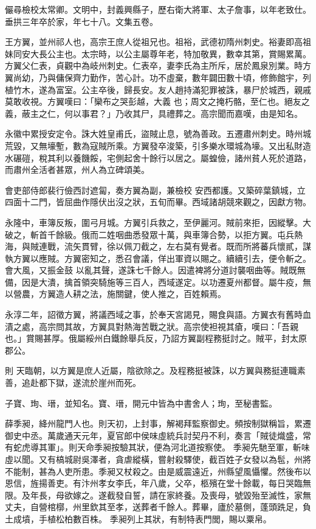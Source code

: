\begin{pinyinscope}
 儼尋檢校太常卿。文明中，封義興縣子，歷右衛大將軍、太子詹事，以年老致仕。垂拱三年卒於家，年七十八。文集五卷。



 王方翼，並州祁人也，高宗王庶人從祖兄也。祖裕，武德初隋州刺史。裕妻即高祖妹同安大長公主也。太宗時，以公主屬尊年老，特加敬異，數幸其第，賞賜累萬。方翼父仁表，貞觀中為岐州刺史。仁表卒，妻李氏為主所斥，居於鳳泉別業。時方翼尚幼，乃與傭保齊力勤作，苦心計。功不虛棄，數年闢田數十頃，修飾館宇，列植竹木，遂為富室。公主卒後，歸長安。友人趙持滿犯罪被誅，暴尸於城西，親戚莫敢收視。方翼嘆曰：「欒布之哭彭越，大義
 也；周文之掩朽骼，至仁也。絕友之義，蔽主之仁，何以事君？」乃收其尸，具禮葬之。高宗聞而嘉嘆，由是知名。



 永徽中累授安定令。誅大姓皇甫氏，盜賊止息，號為善政。五遷肅州刺史。時州城荒毀，又無壕塹，數為寇賊所乘。方翼發卒浚築，引多樂水環城為壕。又出私財造水碾磑，稅其利以養饑餒，宅側起舍十餘行以居之。屬蝗儉，諸州貧人死於道路，而肅州全活者甚眾，州人為立碑頌美。



 會吏部侍郎裴行儉西討遮匐，奏方翼為副，兼檢校
 安西都護。又築碎葉鎮城，立四面十二門，皆屈曲作隱伏出沒之狀，五旬而畢。西域諸胡競來觀之，因獻方物。



 永隆中，車簿反叛，圍弓月城。方翼引兵救之，至伊麗河。賊前來拒，因縱擊。大破之，斬首千餘級。俄而二姓咽曲悉發眾十萬，與車簿合勢，以拒方翼。屯兵熱海，與賊連戰，流矢貫臂，徐以佩刀截之，左右莫有覺者。既而所將蕃兵懷貳，謀執方翼以應賊。方翼密知之，悉召會議，佯出軍資以賜之。續續引去，便令斬之。會大風，又振金鼓
 以亂其聲，遂誅七千餘人。因遣裨將分道討襲咽曲等。賊既無備，因是大潰，擒首領突騎施等三百人，西域遂定。以功遷夏州都督。屬牛疫，無以營農，方翼造人耕之法，施關鍵，使人推之，百姓賴焉。



 永淳二年，詔徵方翼，將議西域之事，於奉天宮謁見，賜食與語。方翼衣有舊時血漬之處，高宗問其故，方翼具對熱海苦戰之狀。高宗使袒視其瘡，嘆曰：「吾親也。」賞賜甚厚。俄屬綏州白鐵餘舉兵反，乃詔方翼副程務挺討之。賊平，封太原郡公。



 則
 天臨朝，以方翼是庶人近屬，陰欲除之。及程務挺被誅，以方翼與務挺連職素善，追赴都下獄，遂流於崖州而死。



 子寶、珣、瑨，並知名。寶、瑨，開元中皆為中書舍人；珣，至秘書監。



 薛季昶，絳州龍門人也。則天初，上封事，解褐拜監察御史。頻按制獄稱旨，累遷御史中丞。萬歲通天元年，夏官郎中侯味虛統兵討契丹不利，奏言「賊徒熾盛，常有蛇虎導其軍」。則天命季昶按驗其狀，便為河北道按察使。
 季昶先馳至軍，斬味虛以聞。又有槁城尉吳澤者，貪虐縱橫，嘗射殺驛使，截百姓子女發以為髢，州將不能制，甚為人吏所患。季昶又杖殺之。由是威震遠近，州縣望風懾懼。然後布以恩信，旌揚善吏。有汴州孝女李氏，年八歲，父卒，柩殯在堂十餘載，每日哭臨無限。及年長，母欲嫁之。遂截發自誓，請在家終養。及喪母，號毀殆至滅性，家無丈夫，自營棺槨，州里欽其至孝，送葬者千餘人。葬畢，廬於墓側，蓬頭跣足，負土成墳，手植松柏數百株。
 季昶列上其狀，有制特表門閭，賜以粟帛。




\end{pinyinscope}

